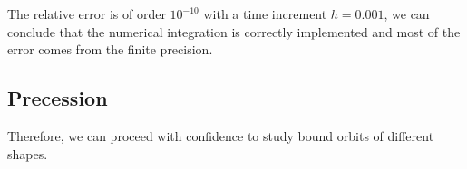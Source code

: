 The relative error is of order $10^{-10}$ with a time increment $h = 0.001$, we
can conclude that the numerical integration is correctly implemented and most
of the error comes from the finite precision.


\subsection{Precession}

Therefore, we can proceed with confidence to study bound orbits of different
shapes.
